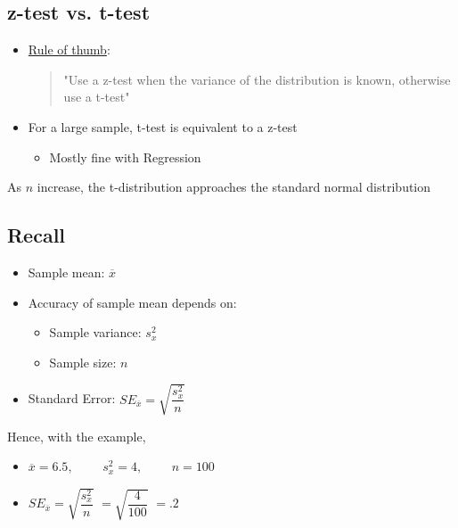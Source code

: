 \documentclass[10pt,article]{article}
\begin{document}
\subsection{z-test vs. t-test}
\label{sec:org4bef5fa}
\begin{itemize}
\item \uline{Rule of thumb}: 
\begin{quote}
"Use a z-test when the variance of the distribution is known, otherwise use
a t-test"
\end{quote}

\item For a large sample, t-test is equivalent to a z-test

\begin{itemize}
\item Mostly fine with Regression
\end{itemize}
\end{itemize}

As \(n\) increase, the t-distribution approaches the standard normal
distribution
\subsection{Recall}
\label{sec:org6390ba5}
\begin{itemize}
\item Sample mean: \(\overline{x}\)

\item Accuracy of sample mean depends on:
\begin{itemize}
\item Sample variance: \(s_x^2\)
\item Sample size: \(n\)
\end{itemize}

\item Standard Error: \(SE_{\overline{x}} = \sqrt{\dfrac{s^2_x}{n}}\)
\end{itemize}

Hence, with the example,

\begin{itemize}
\item \(\overline{x} = 6.5, \qquad\)  \( s_x^2 = 4, \qquad\)  \( n = 100 \)
\item \(SE_{\overline{x}} = \sqrt{\dfrac{s^2_x}{n}}\)  \( = \sqrt{\dfrac{4}{100}} \)  \( = .2 \)
\end{itemize}
\end{document}
